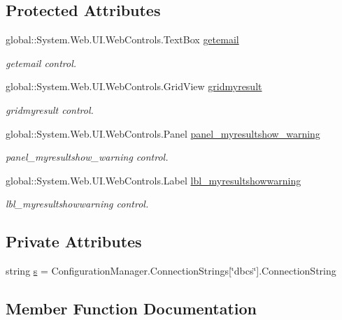\subsection*{Protected Attributes}
\begin{DoxyCompactItemize}
\item 
global\+::\+System.\+Web.\+U\+I.\+Web\+Controls.\+Text\+Box \mbox{\hyperlink{classmyresult_ae669e3bc3fa5f93f7139fd236b4a6f81}{getemail}}
\begin{DoxyCompactList}\small\item\em getemail control. \end{DoxyCompactList}\item 
global\+::\+System.\+Web.\+U\+I.\+Web\+Controls.\+Grid\+View \mbox{\hyperlink{classmyresult_a12067ac0664f564afd5d4b37979df13a}{gridmyresult}}
\begin{DoxyCompactList}\small\item\em gridmyresult control. \end{DoxyCompactList}\item 
global\+::\+System.\+Web.\+U\+I.\+Web\+Controls.\+Panel \mbox{\hyperlink{classmyresult_abc9ba45a21776e13c371e76f926691b5}{panel\+\_\+myresultshow\+\_\+warning}}
\begin{DoxyCompactList}\small\item\em panel\+\_\+myresultshow\+\_\+warning control. \end{DoxyCompactList}\item 
global\+::\+System.\+Web.\+U\+I.\+Web\+Controls.\+Label \mbox{\hyperlink{classmyresult_a86cb5b940d1515bdf6637054e7dcaead}{lbl\+\_\+myresultshowwarning}}
\begin{DoxyCompactList}\small\item\em lbl\+\_\+myresultshowwarning control. \end{DoxyCompactList}\end{DoxyCompactItemize}
\subsection*{Private Attributes}
\begin{DoxyCompactItemize}
\item 
string \mbox{\hyperlink{classmyresult_a6ac3ec2abc13b9b8a48c941e63bb0adb}{s}} = Configuration\+Manager.\+Connection\+Strings\mbox{[}\char`\"{}dbcs\char`\"{}\mbox{]}.Connection\+String
\end{DoxyCompactItemize}


\subsection{Member Function Documentation}
\mbox{\label{classmyresult_a98a7b278804a36efb8058e4c2774c075}} 
